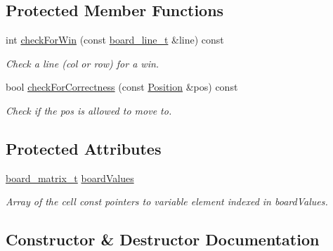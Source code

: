 \subsection*{Protected Member Functions}
\begin{DoxyCompactItemize}
\item 
int \hyperlink{classgame_1_1tic__tac__toe_1_1_board_ac100c056a65c288951f7ffec0f3fd4ad}{check\+For\+Win} (const \hyperlink{namespacegame_1_1tic__tac__toe_a3959bb4b3346bd3cdbf5ae9a5c58cacb}{board\+\_\+line\+\_\+t} \&line) const
\begin{DoxyCompactList}\small\item\em Check a line (col or row) for a win. \end{DoxyCompactList}\item 
bool \hyperlink{classgame_1_1tic__tac__toe_1_1_board_acd788fca5054228f6d44f4c0b5ffca1e}{check\+For\+Correctness} (const \hyperlink{structgame_1_1_position}{Position} \&pos) const
\begin{DoxyCompactList}\small\item\em Check if the pos is allowed to move to. \end{DoxyCompactList}\end{DoxyCompactItemize}
\subsection*{Protected Attributes}
\begin{DoxyCompactItemize}
\item 
\hyperlink{namespacegame_1_1tic__tac__toe_a58fc706fe9ae58c6e9045f6927230232}{board\+\_\+matrix\+\_\+t} \hyperlink{classgame_1_1tic__tac__toe_1_1_board_a56dbed9e12d5e8aa2db2526669201c58}{board\+Values}
\begin{DoxyCompactList}\small\item\em Array of the cell const pointers to variable element indexed in board\+Values. \end{DoxyCompactList}\end{DoxyCompactItemize}


\subsection{Constructor \& Destructor Documentation}
\mbox{\label{classgame_1_1tic__tac__toe_1_1_board_a90e2255675eacaefca2cd89aea681096}} 
